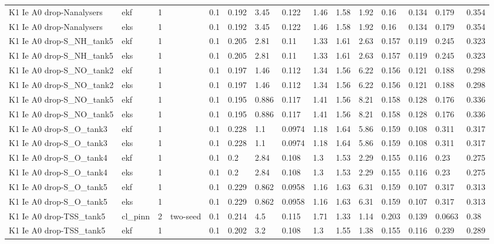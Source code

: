 \begin{table}[t]
\begin{tabular}{lllllllllllllll}
K1 Ie A0 drop-Nanalysers & ekf & 1 &  & 0.1 & 0.192 & 3.45 & 0.122 & 1.46 & 1.58 & 1.92 & 0.16 & 0.134 & 0.179 & 0.354 \\
K1 Ie A0 drop-Nanalysers & eks & 1 &  & 0.1 & 0.192 & 3.45 & 0.122 & 1.46 & 1.58 & 1.92 & 0.16 & 0.134 & 0.179 & 0.354 \\
K1 Ie A0 drop-S\_NH\_tank5 & ekf & 1 &  & 0.1 & 0.205 & 2.81 & 0.11 & 1.33 & 1.61 & 2.63 & 0.157 & 0.119 & 0.245 & 0.323 \\
K1 Ie A0 drop-S\_NH\_tank5 & eks & 1 &  & 0.1 & 0.205 & 2.81 & 0.11 & 1.33 & 1.61 & 2.63 & 0.157 & 0.119 & 0.245 & 0.323 \\
K1 Ie A0 drop-S\_NO\_tank2 & ekf & 1 &  & 0.1 & 0.197 & 1.46 & 0.112 & 1.34 & 1.56 & 6.22 & 0.156 & 0.121 & 0.188 & 0.298 \\
K1 Ie A0 drop-S\_NO\_tank2 & eks & 1 &  & 0.1 & 0.197 & 1.46 & 0.112 & 1.34 & 1.56 & 6.22 & 0.156 & 0.121 & 0.188 & 0.298 \\
K1 Ie A0 drop-S\_NO\_tank5 & ekf & 1 &  & 0.1 & 0.195 & 0.886 & 0.117 & 1.41 & 1.56 & 8.21 & 0.158 & 0.128 & 0.176 & 0.336 \\
K1 Ie A0 drop-S\_NO\_tank5 & eks & 1 &  & 0.1 & 0.195 & 0.886 & 0.117 & 1.41 & 1.56 & 8.21 & 0.158 & 0.128 & 0.176 & 0.336 \\
K1 Ie A0 drop-S\_O\_tank3 & ekf & 1 &  & 0.1 & 0.228 & 1.1 & 0.0974 & 1.18 & 1.64 & 5.86 & 0.159 & 0.108 & 0.311 & 0.317 \\
K1 Ie A0 drop-S\_O\_tank3 & eks & 1 &  & 0.1 & 0.228 & 1.1 & 0.0974 & 1.18 & 1.64 & 5.86 & 0.159 & 0.108 & 0.311 & 0.317 \\
K1 Ie A0 drop-S\_O\_tank4 & ekf & 1 &  & 0.1 & 0.2 & 2.84 & 0.108 & 1.3 & 1.53 & 2.29 & 0.155 & 0.116 & 0.23 & 0.275 \\
K1 Ie A0 drop-S\_O\_tank4 & eks & 1 &  & 0.1 & 0.2 & 2.84 & 0.108 & 1.3 & 1.53 & 2.29 & 0.155 & 0.116 & 0.23 & 0.275 \\
K1 Ie A0 drop-S\_O\_tank5 & ekf & 1 &  & 0.1 & 0.229 & 0.862 & 0.0958 & 1.16 & 1.63 & 6.31 & 0.159 & 0.107 & 0.317 & 0.313 \\
K1 Ie A0 drop-S\_O\_tank5 & eks & 1 &  & 0.1 & 0.229 & 0.862 & 0.0958 & 1.16 & 1.63 & 6.31 & 0.159 & 0.107 & 0.317 & 0.313 \\
K1 Ie A0 drop-TSS\_tank5 & cl\_pinn & 2 & two-seed & 0.1 & 0.214 & 4.5 & 0.115 & 1.71 & 1.33 & 1.14 & 0.203 & 0.139 & 0.0663 & 0.38 \\
K1 Ie A0 drop-TSS\_tank5 & ekf & 1 &  & 0.1 & 0.202 & 3.2 & 0.108 & 1.3 & 1.55 & 1.38 & 0.155 & 0.116 & 0.239 & 0.289 \\

\end{tabular}
\end{table}
